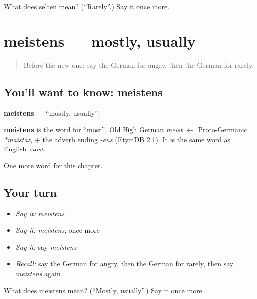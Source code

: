 \begin{tcolorbox}[breakable,colback=teal!4,colframe=teal!35!black,title={Before you move on}]
What does selten mean? (\textquotedblleft{}Rarely\textquotedblright{}.) Say it once more.
\end{tcolorbox}
\section[meistens]{meistens — mostly, usually}

\label{lesson:GE-C170-meistens}



\begin{quote}
Before the new one: say the German for angry, then the German for rarely.
\end{quote}

\subsection*{You'll want to know: meistens}
\textbf{meistens} — \textquotedblleft{}mostly, usually\textquotedblright{}.

\begin{cousinweb}
\textbf{meistens} is the word for \textquotedblleft{}most\textquotedblright{}, Old High German \emph{meist} $\leftarrow$ Proto-Germanic \emph{*maistaz}, + the adverb ending \emph{-ens} (EtymDB 2.1). It is the same word as English \emph{most}.
\end{cousinweb}

\begin{grammarlens}[title={What you've built}]
One more word for this chapter.
\end{grammarlens}

\subsection*{Your turn}
\begin{itemize}
\raggedright
  \item \emph{Say it:} \emph{meistens}
  \item \emph{Say it:} \emph{meistens}, once more
  \item \emph{Say it:} say \emph{meistens}
  \item \emph{Recall:} say the German for angry, then the German for rarely, then say \emph{meistens} again
\end{itemize}

\begin{tcolorbox}[breakable,colback=teal!4,colframe=teal!35!black,title={Before you move on}]
What does meistens mean? (\textquotedblleft{}Mostly, usually\textquotedblright{}.) Say it once more.
\end{tcolorbox}
